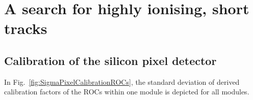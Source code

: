\chapter{\texorpdfstring{A search for highly ionising, short tracks}{Appendix A: \quad A search for highly ionising, short tracks}}
\section{Calibration of the silicon pixel detector}
\label{app:PixelCalibration}
In Fig.~\ref{fig:SigmaPixelCalibrationROCs}, the standard deviation of derived calibration factors of the ROCs within one module is depicted for all modules.

